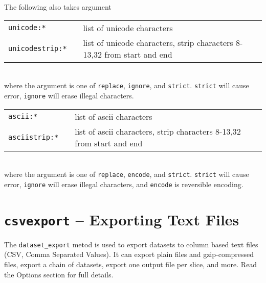 \noindent The following also takes argument\\

\begin{tabular}{p{2cm}p{2cm}p{8cm}}
  \texttt{unicode:*}  && list of unicode characters\\
  \texttt{unicodestrip:*}  && list of unicode characters, strip characters 8-13,32 from start and end\\
\end{tabular}\\[1ex]
where the argument is one of \texttt{replace}, \texttt{ignore}, and \texttt{strict}.
\texttt{strict} will cause error, \texttt{ignore} will erase illegal characters.\\

\begin{tabular}{p{2cm}p{2cm}p{8cm}}
  \texttt{ascii:*}      && list of ascii characters\\
  \texttt{asciistrip:*} && list of ascii characters, strip characters 8-13,32 from start and end\\
\end{tabular}\\[1ex]
where the argument is one of \texttt{replace}, \texttt{encode}, and \texttt{strict}.
\texttt{strict} will cause error, \texttt{ignore} will erase illegal characters,
and \texttt{encode} is reversible encoding.





\clearpage
\section{\texttt{csvexport} -- Exporting Text Files}

The \texttt{dataset\_export} metod is used to export datasets to
column based text files (CSV, Comma Separated Values).  It can export
plain files and gzip-compressed files, export a chain of datasets,
export one output file per slice, and more.  Read the Options section
for full details.

